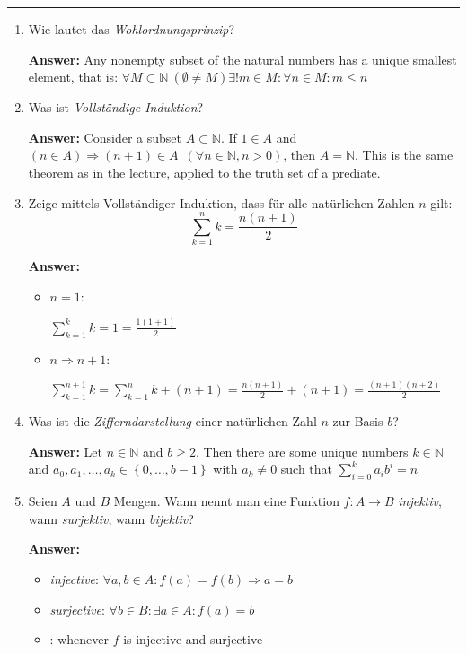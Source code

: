 \documentclass[11pt]{article}
\newcommand{\sumn}[4]{\sum_{#1=#2}^{#3}{#4}}
\begin{document}


\medskip\hrule
\begin{enumerate}
    \item Wie lautet das \textit{Wohlordnungsprinzip}?

    \textbf{Answer:} Any nonempty subset of the natural numbers has a unique smallest element, that is: $\forall M \subset \mathbb{N}~(\emptyset \neq M) \exists! m \in M\colon \forall n \in M\colon m \le n$


    \item Was ist \textit{Vollständige Induktion}?

    \textbf{Answer:} Consider a subset $A \subset \mathbb{N}$. If $1 \in A$ and $(n \in A) \Rightarrow (n+1) \in A\phantom{0}(\forall n \in \mathbb{N}, n > 0)$, then $A = \mathbb{N}$. This is the same theorem as in the lecture, applied to the truth set of a prediate.

    \item Zeige mittels Vollständiger Induktion, dass für alle natürlichen Zahlen $n$ gilt:
    $$\sumn{k}{1}{n}{k} = \frac{n(n+1)}{2}$$

    \textbf{Answer:}
    \begin{itemize}
        \item $n = 1$:

        $\sum_{k=1}^k{k} = 1 = \frac{1(1+1)}{2}$
        \item $n \Rightarrow n + 1$:

        $\sum_{k=1}^{n+1}{k} = \sum_{k=1}^n{k} + (n+1) = \frac{n(n+1)}{2} + (n+1) = \frac{(n+1)(n + 2)}{2}$
    \end{itemize}

    \item Was ist die \textit{Zifferndarstellung} einer natürlichen Zahl $n$ zur Basis $b$?

    \textbf{Answer:} Let $n \in \mathbb{N}$ and $b \ge 2$. Then there are some unique numbers $k \in \mathbb{N}$ and $a_0, a_1, \dots, a_k \in \left\{0, \dots, b-1\right\}$ with $a_k \neq 0$   such that $\sum_{i=0}^k {a_i b^i} = n$


    \item Seien $A$ und $B$ Mengen. Wann nennt man eine Funktion $f\colon A \to B$ \textit{injektiv}, wann
    \textit{surjektiv}, wann \textit{bijektiv}?

    \textbf{Answer:}
    \begin{itemize}
        \item \textit{injective}: $\forall a, b \in A\colon f(a) = f(b) \Rightarrow a = b$
        \item \textit{surjective}: $\forall b\in B\colon \exists a\in A\colon f(a) = b$
        \item {}: whenever $f$ is injective and surjective
    \end{itemize}


\end{enumerate}
\end{document}
